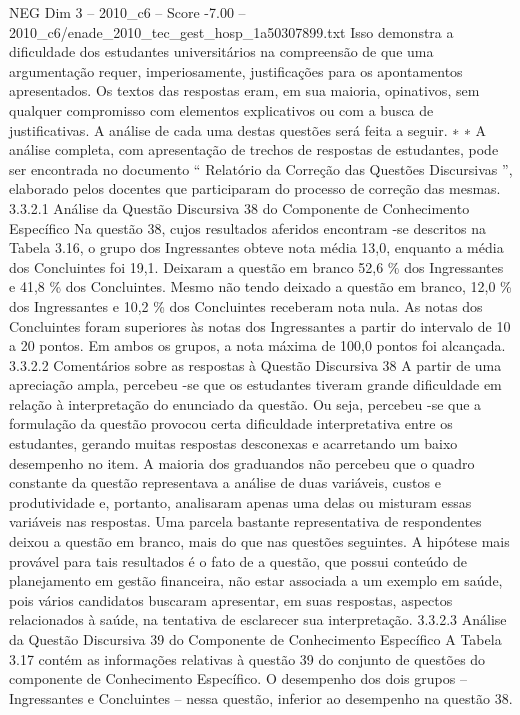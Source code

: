 \begin{textsample}{NEG Dim 3 – 2010\_c6 – Score -7.00 – 2010\_c6/enade\_2010\_tec\_gest\_hosp\_1a50307899.txt}
Isso demonstra a dificuldade dos estudantes universitários na compreensão de que uma argumentação requer, imperiosamente, justificações para os apontamentos apresentados.
Os textos das respostas eram, em sua maioria, opinativos, sem qualquer compromisso com elementos explicativos ou com a busca de justificativas.
A análise de cada uma destas questões será feita a seguir. ∗ ∗ A análise completa, com apresentação de trechos de respostas de estudantes, pode ser encontrada no documento “ Relatório da Correção das Questões Discursivas ”, elaborado pelos docentes que participaram do processo de correção das mesmas. 3.3.2.1 Análise da Questão Discursiva 38 do Componente de Conhecimento Específico Na questão 38, cujos resultados aferidos encontram -se descritos na Tabela 3.16, o grupo dos Ingressantes obteve nota média 13,0, enquanto a média dos Concluintes foi 19,1.
Deixaram a questão em branco 52,6 \% dos Ingressantes e 41,8 \% dos Concluintes.
Mesmo não tendo deixado a questão em branco, 12,0 \% dos Ingressantes e 10,2 \% dos Concluintes receberam nota nula.
As notas dos Concluintes foram superiores às notas dos Ingressantes a partir do intervalo de 10 a 20 pontos.
Em ambos os grupos, a nota máxima de 100,0 pontos foi alcançada. 3.3.2.2 Comentários sobre as respostas à Questão Discursiva 38 A partir de uma apreciação ampla, percebeu -se que os estudantes tiveram grande dificuldade em relação à interpretação do enunciado da questão.
Ou seja, percebeu -se que a formulação da questão provocou certa dificuldade interpretativa entre os estudantes, gerando muitas respostas desconexas e acarretando um baixo desempenho no item.
A maioria dos graduandos não percebeu que o quadro constante da questão representava a análise de duas variáveis, custos e produtividade e, portanto, analisaram apenas uma delas ou misturam essas variáveis nas respostas.
Uma parcela bastante representativa de respondentes deixou a questão em branco, mais do que nas questões seguintes.
A hipótese mais provável para tais resultados é o fato de a questão, que possui conteúdo de planejamento em gestão financeira, não estar associada a um exemplo em saúde, pois vários candidatos buscaram apresentar, em suas respostas, aspectos relacionados à saúde, na tentativa de esclarecer sua interpretação. 3.3.2.3 Análise da Questão Discursiva 39 do Componente de Conhecimento Específico A Tabela 3.17 contém as informações relativas à questão 39 do conjunto de questões do componente de Conhecimento Específico.
O desempenho dos dois grupos – Ingressantes e Concluintes – nessa questão, inferior ao desempenho na questão 38.

\end{textsample}
